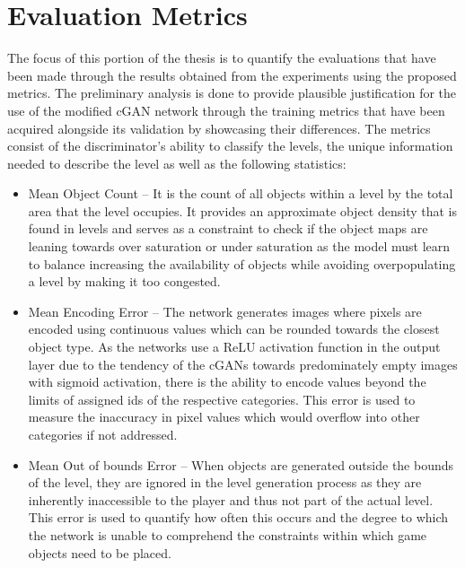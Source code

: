 \documentclass{Configuration_Files/PoliMi3i_thesis}
\begin{document}
\section{Evaluation Metrics}
The focus of this portion of the thesis is to quantify the evaluations that have 
been made through the results obtained from the experiments using the proposed 
metrics. The preliminary analysis is done to provide plausible justification for the use of the 
modified cGAN network through the training metrics that have been acquired 
alongside its validation by showcasing their differences. The metrics consist of the 
discriminator’s ability to classify the levels, the unique information needed to 
describe the level as well as the following statistics:
\begin{itemize}
\item Mean Object Count – It is the count of all objects within a level by the total 
area that the level occupies. It provides an approximate object density that is 
found in levels and serves as a constraint to check if the object maps are 
leaning towards over saturation or under saturation as the model must learn 
to balance increasing the availability of objects while avoiding overpopulating
a level by making it too congested.
\item Mean Encoding Error – The network generates images where pixels are encoded 
using continuous values which can be rounded towards the closest object type. As the 
networks use a ReLU activation function in the output layer due to the tendency of the 
cGANs towards predominately empty images with sigmoid activation, there is the ability 
to encode values  beyond the limits of assigned ids of the respective categories. This 
error is used to measure the inaccuracy in pixel values which would overflow into other 
categories if not addressed.
\item Mean Out of bounds Error – When objects are generated outside the bounds 
of the level, they are ignored in the level generation process as they are 
inherently inaccessible to the player and thus not part of the actual level. This 
error is used to quantify how often this occurs and the degree to which the 
network is unable to comprehend the constraints within which game objects 
need to be placed.
\end{itemize}
\newpage
\end{document}
